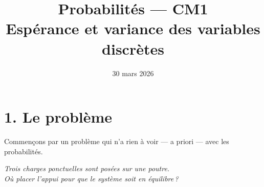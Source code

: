 


\newcommand{\atrou}[2][3cm]{%
  \ifthenelse{\boolean{showSolutions}}{%
    \par\vspace{0.5em}%
    \begin{mdframed}[backgroundcolor=ThemeLight, linewidth=0pt,
      skipabove=0pt, skipbelow=0pt,
      innertopmargin=8pt, innerbottommargin=8pt]%
    #2%
    \end{mdframed}%
    \par\vspace{0.5em}%
  }{%
    \par\vspace{0.5em}%
    \noindent\fbox{\begin{minipage}[c][#1]%
      {\dimexpr\textwidth-2\fboxsep-2\fboxrule\relax}%
      \color{white}\rule{0pt}{0pt}%
    \end{minipage}}%
    \par\vspace{0.5em}%
  }%
}

\newcommand{\val}[1]{%
  \ifthenelse{\boolean{showSolutions}}{#1}{\phantom{#1}}%
}

\title{\sffamily\bfseries Probabilités --- CM1\\[0.3em]
  \Large Espérance et variance des variables discrètes}
\author{}
\date{30 mars 2026}


\sffamily
\maketitle
\thispagestyle{empty}

\section*{1. Le problème}

Commençons par un problème qui n'a rien à voir
--- a priori --- avec les probabilités.

\begin{center}
\begin{mdframed}[backgroundcolor=ThemeLight, linecolor=Theme,
  linewidth=1.5pt, innertopmargin=10pt, innerbottommargin=10pt]
\centering\large\itshape
\og Trois charges ponctuelles sont posées sur une poutre.\\[0.3em]
Où placer l'appui pour que le système soit en équilibre\,?\fg{}
\end{mdframed}
\end{center}


